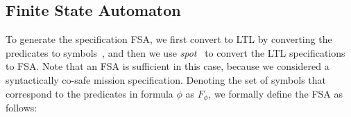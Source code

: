 \documentclass[letterpaper]{article} %
\begin{document}
\subsection{Finite State Automaton}
\label{sec:FSA}
To generate the specification FSA, we first convert \DTL to LTL by converting the predicates to symbols~\cite{JonesDTL2013},
and then we use {\em spot}~\cite{duret14} to convert the LTL specifications to FSA.
Note that an FSA is sufficient in this case, because we considered a syntactically co-safe mission specification.
Denoting the set of symbols that correspond to the predicates in \DTL formula $\phi$ as $F_\phi$, we formally define the FSA as follows:

\end{document}
